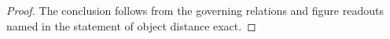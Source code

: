 \begin{proof}
  The conclusion follows from the governing relations and figure readouts named in the statement of object distance exact.
\end{proof}
